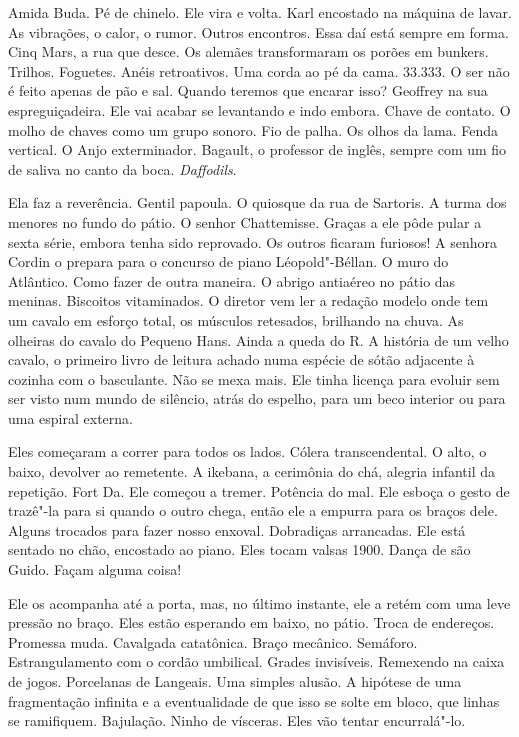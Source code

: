 Amida Buda. Pé de chinelo. Ele vira e volta. Karl encostado na máquina
de lavar. As vibrações, o calor, o rumor. Outros encontros. Essa daí
está sempre em forma. Cinq Mars, a rua que desce. Os alemães
transformaram os porões em bunkers. Trilhos. Foguetes. Anéis
retroativos. Uma corda ao pé da cama. 33.333. O ser não é feito apenas
de pão e sal. Quando teremos que encarar isso? Geoffrey na sua
espreguiçadeira. Ele vai acabar se levantando e indo embora. Chave de
contato. O molho de chaves como um grupo sonoro. Fio de palha. Os olhos
da lama. Fenda vertical. O Anjo exterminador. Bagault, o professor de
inglês, sempre com um fio de saliva no canto da boca. \emph{Daffodils}.

Ela faz a reverência. Gentil papoula. O quiosque da rua de Sartoris. A
turma dos menores no fundo do pátio. O senhor Chattemisse. Graças a ele
pôde pular a sexta série, embora tenha sido reprovado. Os outros ficaram
furiosos! A senhora Cordin o prepara para o concurso de piano
Léopold"-Béllan. O muro do Atlântico. Como fazer de outra maneira. O
abrigo antiaéreo no pátio das meninas. Biscoitos vitaminados. O diretor
vem ler a redação modelo onde tem um cavalo em esforço total, os
músculos retesados, brilhando na chuva. As olheiras do cavalo do Pequeno
Hans. Ainda a queda do R. A história de um velho cavalo, o primeiro
livro de leitura achado numa espécie de sótão adjacente à cozinha com o
basculante. Não se mexa mais. Ele tinha licença para evoluir sem ser
visto num mundo de silêncio, atrás do espelho, para um beco interior ou
para uma espiral externa.

Eles começaram a correr para todos os lados. Cólera transcendental. O
alto, o baixo, devolver ao remetente. A ikebana, a cerimônia do chá,
alegria infantil da repetição. Fort Da. Ele começou a tremer. Potência
do mal. Ele esboça o gesto de trazê"-la para si quando o outro chega,
então ele a empurra para os braços dele. Alguns trocados para fazer
nosso enxoval. Dobradiças arrancadas. Ele está sentado no chão,
encostado ao piano. Eles tocam valsas 1900. Dança de são Guido. Façam
alguma coisa!

Ele os acompanha até a porta, mas, no último instante, ele a retém com
uma leve pressão no braço. Eles estão esperando em baixo, no pátio. %
Troca de endereços. Promessa muda. Cavalgada catatônica. Braço mecânico.
Semáforo. Estrangulamento com o cordão umbilical. Grades invisíveis.
Remexendo na caixa de jogos. Porcelanas de Langeais. Uma simples alusão.
A hipótese de uma fragmentação infinita e a eventualidade de que isso se
solte em bloco, que linhas se ramifiquem. Bajulação. Ninho de vísceras.
Eles vão tentar encurralá"-lo.


